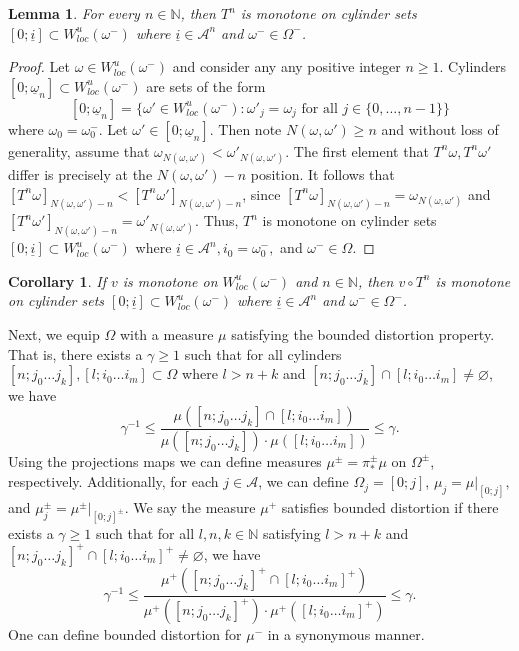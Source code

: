 \documentclass{amsart}
\newtheorem{lemma}{Lemma}
\newtheorem{corollary}{Corollary}
\newcommand{\NN}{\mathbb{N}}
\newcommand{\A}{\mathcal{A}}
\begin{document}
\begin{lemma}\label{l.resord}
    For every $n\in \NN$, then $T^n$ is monotone on cylinder sets $[0;\underline{i}]\subset W^u_{loc}(\omega^-)$ where $\underline{i}\in \A^n$ and $\omega^- \in \Omega^-$.
\end{lemma}
\begin{proof}
    Let $\omega\in  W^u_{loc}(\omega^-)$ and consider any any positive integer $n\geq 1$. Cylinders $[0;\underline{\omega}_n]\subset W^u_{loc}(\omega^-)$ are sets of the form
    \[[0;\underline{\omega}_n] = \{\omega'\in W^u_{loc}(\omega^-): \omega'_j = \omega_j \text{ for all } j\in \{0,\dots, n-1\}\}\]
    where $\omega_0 = \omega^-_0$. Let $\omega'\in [0;\underline{\omega}_n]$. Then note $N(\omega,\omega')\geq n$ and without loss of generality, assume that $\omega_{N(\omega,\omega')} < \omega'_{N(\omega,\omega')}$. The first element that $T^n\omega, T^n\omega'$ differ is precisely at the $N(\omega,\omega') - n$ position. It follows that $[T^n\omega]_{N(\omega,\omega') - n} < [T^n\omega']_{N(\omega,\omega') - n}$, since $[T^n\omega]_{N(\omega,\omega') - n} = \omega_{N(\omega,\omega')}$ and $[T^n\omega']_{N(\omega,\omega') - n} = \omega'_{N(\omega,\omega')}$. Thus, $T^n$ is monotone on cylinder sets $[0;\underline{i}]\subset W^u_{loc}(\omega^-)$ where $\underline{i}\in \A^n, i_0 = \omega^-_0,$ and $\omega^-\in \Omega$. 
\end{proof}

\begin{corollary}\label{c.compmonotone}
    If $v$ is monotone on $W^u_{loc}(\omega^-)$ and $n\in \NN$, then $v\circ T^n$ is monotone on cylinder sets $[0;\underline{i}]\subset W^u_{loc}(\omega^-)$ where $\underline{i}\in \A^n$ and $\omega^-\in \Omega^-$.
\end{corollary}

Next, we equip $\Omega$ with a measure $\mu$ satisfying the bounded distortion property. That is, there exists a $\gamma\geq 1$ such that for all cylinders $[n;j_0\dots j_k], [l; i_0\dots i_m] \subset \Omega$ where $l> n+k$ and $[n;j_0\dots j_k] \cap [l; i_0\dots i_m] \neq \varnothing$, we have
\[\gamma^{-1} \leq \frac{\mu([n;j_0\dots j_k]\cap [l; i_0\dots i_m])}{\mu([n;j_0\dots j_k])\cdot  \mu([l; i_0\dots i_m])} \leq \gamma.\]
Using the projections maps we can define measures $\mu^\pm = \pi^\pm_*\mu$ on $\Omega^\pm$, respectively. Additionally, for each $j\in \A$, we can define $\Omega_j = [0;j]$, $\mu_j = \mu|_{[0;j]},$ and $ \mu^\pm_j = \mu^\pm|_{[0;j]^\pm}$. We say the measure $\mu^+$ satisfies bounded distortion if there exists a $\gamma\geq 1$ such that for all $l,n,k\in \NN$ satisfying $l> n+k$ and $[n;j_0\dots j_k]^+ \cap [l; i_0\dots i_m]^+ \neq \varnothing$, we have
\[\gamma^{-1} \leq \frac{\mu^+([n;j_0\dots j_k]^+\cap [l; i_0\dots i_m]^+)}{\mu^+([n;j_0\dots j_k]^+)\cdot  \mu^+([l; i_0\dots i_m]^+)} \leq \gamma.\]
One can define bounded distortion for $\mu^-$ in a synonymous manner. 
\end{document}
